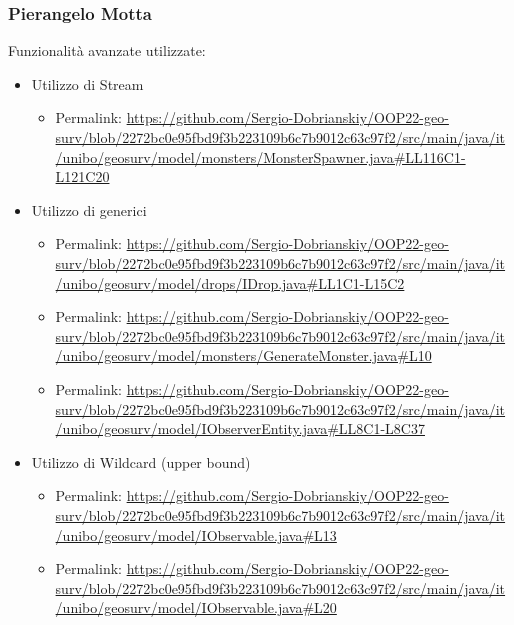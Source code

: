 \documentclass[a4paper,12pt]{report}
\begin{document}
\subsubsection{Pierangelo Motta}
Funzionalità avanzate utilizzate:
 \begin{itemize}
 	\item Utilizzo di Stream
 	 \begin{itemize}
 	 	\item Permalink: \url{https://github.com/Sergio-Dobrianskiy/OOP22-geo-surv/blob/2272bc0e95fbd9f3b223109b6c7b9012c63c97f2/src/main/java/it/unibo/geosurv/model/monsters/MonsterSpawner.java#LL116C1-L121C20}
 	 \end{itemize}
 	 
 	\item Utilizzo di generici
 	 \begin{itemize}
 	 	\item Permalink: \url{https://github.com/Sergio-Dobrianskiy/OOP22-geo-surv/blob/2272bc0e95fbd9f3b223109b6c7b9012c63c97f2/src/main/java/it/unibo/geosurv/model/drops/IDrop.java#LL1C1-L15C2}
 	 	\item Permalink: \url{https://github.com/Sergio-Dobrianskiy/OOP22-geo-surv/blob/2272bc0e95fbd9f3b223109b6c7b9012c63c97f2/src/main/java/it/unibo/geosurv/model/monsters/GenerateMonster.java#L10}
 	 	 	 	\item Permalink: \url{https://github.com/Sergio-Dobrianskiy/OOP22-geo-surv/blob/2272bc0e95fbd9f3b223109b6c7b9012c63c97f2/src/main/java/it/unibo/geosurv/model/IObserverEntity.java#LL8C1-L8C37}
 	 \end{itemize}
	\item Utilizzo di Wildcard (upper bound)
 	\begin{itemize}
 	 	\item Permalink: \url{https://github.com/Sergio-Dobrianskiy/OOP22-geo-surv/blob/2272bc0e95fbd9f3b223109b6c7b9012c63c97f2/src/main/java/it/unibo/geosurv/model/IObservable.java#L13}
 	\end{itemize}
 	\begin{itemize}
 	 	\item Permalink: \url{https://github.com/Sergio-Dobrianskiy/OOP22-geo-surv/blob/2272bc0e95fbd9f3b223109b6c7b9012c63c97f2/src/main/java/it/unibo/geosurv/model/IObservable.java#L20}
 	\end{itemize}
	
\end{itemize}
\end{document}
